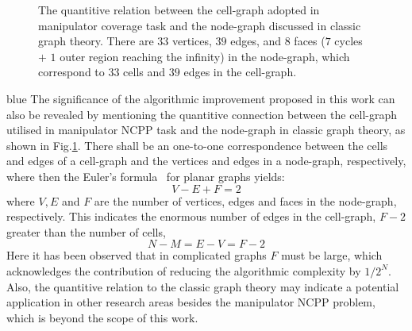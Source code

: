 \documentclass[journal]{IEEEtran}
\begin{document}
\begin{figure}[t]
\centering
{}
\caption{The quantitive relation between the cell-graph adopted in manipulator coverage task and the node-graph discussed in classic graph theory. There are $33$ vertices, $39$ edges, and $8$ faces ($7$ cycles $+$ $1$ outer region reaching the infinity) in the node-graph, which correspond to $33$ cells and $39$ edges in the cell-graph. }\label{fig:node_graph}
\end{figure}

\begin{color}{blue}
The significance of the algorithmic improvement proposed in this work can also be revealed by mentioning the quantitive connection between the cell-graph utilised in manipulator NCPP task and the node-graph in classic graph theory, as shown in Fig.\ref{fig:node_graph}. There shall be an one-to-one correspondence between the cells and edges of a cell-graph and the vertices and edges in a node-graph, respectively, where then the Euler's formula~\cite{Bondy1976Graph} for planar graphs yields: 
\begin{equation}
V - E + F = 2
\end{equation}
where $V, E$ and $F$ are the number of vertices, edges and faces in the node-graph, respectively. This indicates the enormous number of edges in the cell-graph, $F-2$ greater than the number of cells, 
\begin{equation}
N - M = E - V = F - 2
\end{equation} 
Here it has been observed that in complicated graphs $F$ must be large, which acknowledges the contribution of reducing the algorithmic complexity by $1/2^N$. 
Also, the quantitive relation to the classic graph theory may indicate a potential application in other research areas besides the manipulator NCPP problem, which is beyond the scope of this work. 
\end{color}
\end{document}
